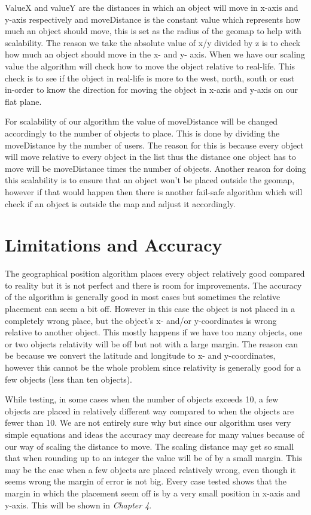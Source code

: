 ValueX and valueY are the distances in which an object will move in x-axis and y-axis respectively and moveDistance is the constant value which represents how much an object should move, this is set as the radius of the geomap to help with scalability. The reason we take the absolute value of x/y divided by z is to check how much an object should move in the x- and y- axis. When we have our scaling value the algorithm will check how to move the object relative to real-life. This check is to see if the object in real-life is more to the west, north, south or east in-order to know the direction for moving the object in x-axis and y-axis on our flat plane.

For scalability of our algorithm the value of moveDistance will be changed accordingly to the number of objects to place. This is done by dividing the moveDistance by the number of users. The reason for this is because every object will move relative to every object in the list thus the distance one object has to move will be moveDistance times the number of objects. Another reason for doing this scalability is to ensure that an object won't be placed outside the geomap, however if that would happen then there is another fail-safe algorithm which will check if an object is outside the map and adjust it accordingly.

\section{Limitations and Accuracy}
\label{sec:limacc}

The geographical position algorithm places every object relatively good compared to reality but it is not perfect and there is room for improvements. The accuracy of the algorithm is generally good in most cases but sometimes the relative placement can seem a bit off. However in this case the object is not placed in a completely wrong place, but the object's x- and/or y-coordinates is wrong relative to another object. This mostly happens if we have too many objects, one or two objects relativity will be off but not with a large margin. The reason can be because we convert the latitude and longitude to x- and y-coordinates, however this cannot be the whole problem since relativity is generally good for a few objects (less than ten objects).

While testing, in some cases when the number of objects exceeds 10, a few objects are placed in relatively different way compared to when the objects are fewer than 10. We are not entirely sure why but since our algorithm uses very simple equations and ideas the accuracy may decrease for many values because of our way of scaling the distance to move. The scaling distance may get so small that when rounding up to an integer the value will be of by a small margin. This may be the case when a few objects are placed relatively wrong, even though it seems wrong the margin of error is not big. Every case tested shows that the margin in which the placement seem off is by a very small position in x-axis and y-axis. This will be shown in \textit{Chapter 4}.



